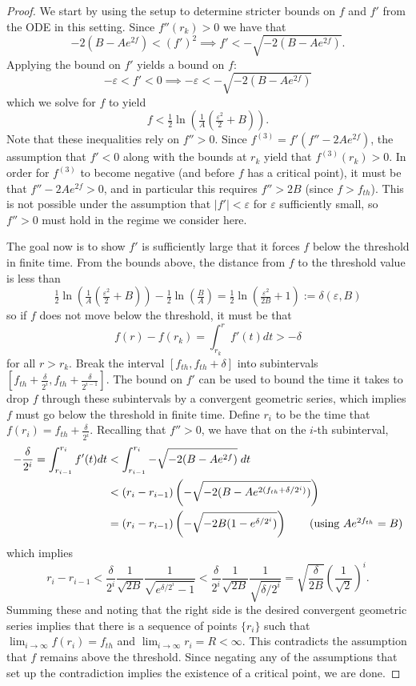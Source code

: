 \documentclass[12pt, a4paper, reqno, oneside]{amsart}
\renewcommand{\epsilon}{\varepsilon}
\numberwithin{equation}{section}
\theoremstyle{plain}
\theoremstyle{definition}
\theoremstyle{plain}
\begin{document}
\begin{proof}
  We start by using the setup to determine stricter bounds on $f$ and $f'$ from the ODE in this setting. Since $f''(r_{k})>0$ we have that
  \[
    -2(B-Ae^{2f})<(f')^{2} \implies f'<-\sqrt{-2(B-Ae^{2f})}.
  \]
  Applying the bound on $f'$ yields a bound on $f$: 
  \[
    -\epsilon<f'<0 \implies -\epsilon<-\sqrt{-2(B-Ae^{2f})}
  \]
  which we solve for $f$ to yield
  \[
    f<\tfrac{1}{2}\ln\left(\tfrac{1}{A}\left(\tfrac{\epsilon^{2}}{2}+B\right)\right).
  \]
  Note that these inequalities rely on $f''>0$. Since $f^{(3)}=f'(f''-2Ae^{2f})$, the assumption that $f'<0$ along with the bounds at $r_{k}$ yield that $f^{(3)}(r_k)>0$. In order for $f^{(3)}$ to become negative (and before $f$ has a critical point), it must be that $f''-2Ae^{2f}>0$, and in particular this requires $f''>2B$ (since $f>f_{th}$). This is not possible under the assumption that $|f'|<\epsilon$ for $\epsilon$ sufficiently small, so $f''>0$ must hold in the regime we consider here.

  The goal now is to show $f'$ is sufficiently large that it forces $f$ below the threshold in finite time. From the bounds above, the distance from $f$ to the threshold value is less than
  \[
    \tfrac{1}{2}\ln\left(\tfrac{1}{A}\left(\tfrac{\epsilon^{2}}{2}+B\right)\right) - \tfrac{1}{2}\ln\left(\tfrac{B}{A}\right) = \tfrac{1}{2}\ln\left(\tfrac{\epsilon^{2}}{2B}+1\right) := \delta(\epsilon, B)
  \]
  so if $f$ does not move below the threshold, it must be that
  \[
    f(r)-f(r_k) = \int_{r_{k}}^{r}f'(t)dt > -\delta
  \]
  for all $r>r_{k}$. Break the interval $[f_{th},f_{th}+\delta]$ into subintervals $[f_{th}+\tfrac{\delta}{2^i}, f_{th}+\tfrac{\delta}{2^{{i-1}}}]$. The bound on $f'$ can be used to bound the time it takes to drop $f$ through these subintervals by a convergent geometric series, which implies $f$ must go below the threshold in finite time. Define $r_{i}$ to be the time that $f(r_{i})=f_{th}+\tfrac{\delta}{2^i}$. Recalling that $f''>0$, we have that on the $i$-th subinterval,
  \begin{align*}
    -\frac{\delta}{2^{i}} = \int_{r_{i-1}}^{r_{i}}f'(t)dt &< \int_{r_{i-1}}^{r_{i}}-\sqrt{-2(B-Ae^{2f})}\;dt\\
      &< (r_{i}-r_{i-1})\left(-\sqrt{-2(B-Ae^{2(f_{th}+\delta/2^{i})})}\right)\\
      &= (r_{i}-r_{i-1})\left(-\sqrt{-2B(1-e^{\delta/2^{i}})}\right)   \tag*{(using $Ae^{2f_{th}}=B$)}
  \end{align*}
  which implies 
  \[
    r_{i}-r_{i-1}< \frac{\delta}{2^{i}}\frac{1}{\sqrt{2B}}\frac{1}{\sqrt{e^{\delta/2^{i}}-1}}<\frac{\delta}{2^{i}}\frac{1}{\sqrt{2B}}\frac{1}{\sqrt{\delta/2^{i}}}=\sqrt{\frac{\delta}{2B}}\left(\frac{1}{\sqrt{2}}\right)^{i}.
  \]
  Summing these and noting that the right side is the desired convergent geometric series implies that there is a sequence of points $\{r_{i}\}$ such that $\lim_{i\to\infty}f(r_{i})=f_{th}$ and $\lim_{i\to\infty}r_{i}=R<\infty$. This contradicts the assumption that $f$ remains above the threshold. Since negating any of the assumptions that set up the contradiction implies the existence of a critical point, we are done.
\end{proof}
\end{document}
